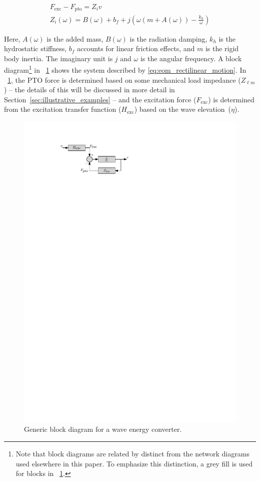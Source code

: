\documentclass[lettersize,journal]{IEEEtran}
\begin{document}
\begin{subequations}
\begin{gather}
        F_{\textrm{exc}} - F_{\textrm{pto}} = Z_i v \label{eq:eom_rectilinear_motion} \\
        Z_i(\omega) = B(\omega) + b_f + j \left( \omega \left( m + A(\omega) \right) - \frac{k_{h}}{\omega}\right)
\end{gather}
\end{subequations}

\noindent{}\noindent{}Here, $A(\omega)$ is the added mass, $B(\omega)$ is the radiation damping, $k_h$ is the hydrostatic stiffness, $b_f$ accounts for linear friction effects, and $m$ is the rigid body inertia.
The imaginary unit is $j$ and $\omega$ is the angular frequency.
A block diagram\footnote{\label{fn:block_diagrams}Note that block diagrams are related by distinct from the network diagrams used elsewhere in this paper. To emphasize this distinction, a grey fill is used for blocks in \figurename~\ref{fig:wec_as_multiport_block_diagram}.} in \figurename~\ref{fig:wec_as_multiport_block_diagram} shows the system described by \eqref{eq:eom_rectilinear_motion}.
In \figurename~\ref{fig:wec_as_multiport_block_diagram}, the PTO force is determined based on some mechanical load impedance ($Z_{\ell m}$) -- the details of this will be discussed in more detail in Section~\ref{sec:illustrative_examples} -- and the excitation force ($F_{\textrm{exc}}$) is determined from the excitation transfer function ($H_{\textrm{exc}}$) based on the wave elevation~($\eta$).

\begin{figure}[tb]
        \centering
        \includegraphics[width=0.8\columnwidth]{wec_as_multiport_block_diagram.pdf}
        \caption{Generic block diagram for a wave energy converter.}
        \label{fig:wec_as_multiport_block_diagram}
\end{figure}
\end{document}
